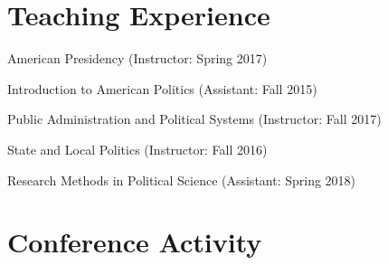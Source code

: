 \documentclass[12pt,letterpaper]{article}
\begin{document}
\section*{\sf Teaching Experience}
American Presidency (Instructor: Spring 2017) \par
Introduction to American Politics (Assistant: Fall 2015) \par
Public Administration and Political Systems (Instructor: Fall 2017) \par
State and Local Politics (Instructor: Fall 2016) \par
Research Methods in Political Science (Assistant: Spring 2018) \par

\section*{\sf Conference Activity}
\end{document}
